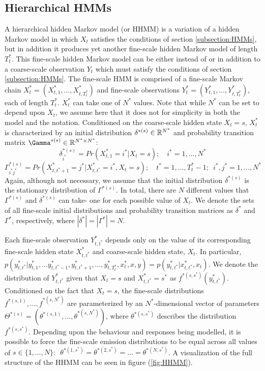 \subsection{Hierarchical HMMs}

A hierarchical hidden Markov model (or HHMM) is a variation of a hidden Markov model in which $X_t$ satisfies the conditions of section \ref{subsection:HMMs}, but in addition it produces yet another fine-scale hidden Markov model of length $T_t^*$. This fine-scale hidden Markov model can be either instead of \cite{Barajas:2017} or in addition to \cite{Adam:2019} a coarse-scale observation $Y_t$ which must satisfy the conditions of section \ref{subsection:HMMs}. The fine-scale HMM is comprised of a fine-scale Markov chain $X^*_t = (X^*_{t,1}, \ldots, X^*_{t,T^*_t})$ and fine-scale observations $Y^*_t = (Y^*_{t,1}, \ldots, Y^*_{t,T^*_t})$, each of length $T^*_t$. $X^*_t$ can take one of $N^*$ values. Note that while $N^*$ can be set to depend upon $X_t$, we assume here that it does not for simplicity in both the model and the notation. Conditioned on the coarse-scale hidden state $X_t = s$, $X^*_t$ is characterized by an initial distribution $\delta^{*(s)} \in \mathbb{R}^{N^*}$ and probability transition matrix $\Gamma^{*(s)} \in \bbR^{N^* \times N^*}$:
%
$$\delta^{*(s)}_{i^*} = Pr(X^*_{t,1} = i^* | X_t = s); \quad i^* = 1,\ldots,N^*$$
%
$$\Gamma^{*(s)}_{i^*j^*} = Pr(X^*_{t,t^*+1} = j^* | X^*_{t,t^*} = i^*, X_t = s); \quad t^* = 1, \ldots, T^*_t-1; \enspace i^*,j^* = 1,\ldots,N^*$$
%
Again, although not necessary, we assume that the initial distribution $\delta^{*(s)}$ is the stationary distribution of $\Gamma^{*(s)}$. In total, there are $N$ different values that $\Gamma^{*(s)}$ and $\delta^{*(s)}$ can take- one for each possible value of $X_t$. We denote the sets of all fine-scale initial distributions and probability transition matrices as $\delta^*$ and $\Gamma^*$, respectively, where $|\delta^*| = |\Gamma^*| = N$.

Each fine-scale observation $Y^*_{t,t^*}$ depends only on the value of its corresponding fine-scale hidden state $X^*_{t,t^*}$ and coarse-scale hidden state, $X_t$. In particular, $p(y^*_{t,t^*} | y^*_{t,1}, \ldots y^*_{t,t^*-1},y^*_{t,t^*+1},\ldots,y^*_{t,T^*_t},x^*_t,x,y) = p(y^*_{t,t^*}|x^*_{t,t^*},x_t)$. We denote the distribution of $Y^*_{t,t^*}$ given that $X_t = s$ and $X^*_{t,t^*} = s^*$ as $f^{*(s,s^*)}(y^*_{t,t^*})$. Conditioned on the fact that $X_t = s$, the fine-scale distributions $f^{*(s,1)}, \ldots, f^{*(s,N^*)}$ are parameterized by an $N^*$-dimensional vector of parameters $\Theta^{*(s)} = (\theta^{*(s,1)},\ldots,\theta^{*(s,N^*)})$, where $\theta^{*(s,s^*)}$ describes the distribution $f^{*(s,s^*)}$. Depending upon the behaviour and responses being modelled, it is possible to force the fine-scale emission distributions to be equal across all values of $s \in \{1, \ldots, N\}: \enspace \theta^{*(1,s^*)} = \theta^{*(2,s^*)} = \ldots = \theta^{*(N,s^*)}$. A visualization of the full structure of the HHMM can be seen in figure (\ref{fig:HHMM}). 

